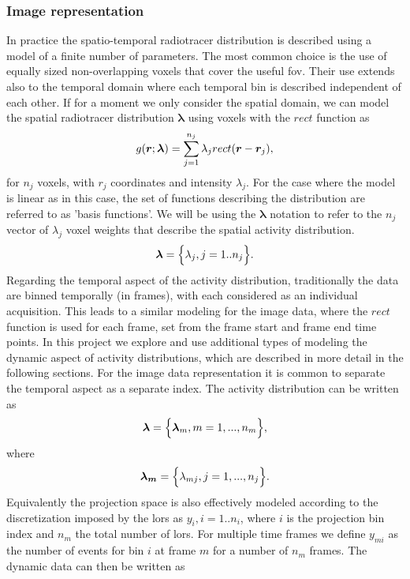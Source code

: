 \subsubsection{Image representation}
In practice the spatio-temporal radiotracer distribution is described using a model of a finite number of parameters. The most common choice is the use of equally sized non-overlapping voxels that cover the useful \gls{fov}. Their use extends also to the temporal domain where each temporal bin is described independent of each other. 
If for a moment we only consider the spatial domain, we can model the spatial radiotracer distribution $\bm{\lambda}$ using voxels with the  $rect$ function as
\begin{equation}
   g(\bm{r};\bm\lambda) = \sum_{j=1}^{n_{j}} \lambda_j {rect}(\bm{r}-\bm{r}_j)  \\, 
\end{equation}
for ${n_{j}}$ voxels, with $r_j$ coordinates and intensity $\lambda_j$.
For the case where the model is linear as in this case, the set of functions describing the distribution are referred to as 'basis functions'. We will be using the $\bm\lambda$ notation to refer to the ${n_{j}}$ vector of  $\lambda_j$ voxel weights that describe the spatial activity distribution. 
\begin{equation}
   \bm\lambda = \Big\{ \lambda_j,j=1..n_j \Big\} \\.
\end{equation}
Regarding the temporal aspect of the activity distribution, traditionally the data are binned temporally (in frames), with each considered as an individual acquisition. This leads to a similar modeling for the image data, where the $rect$ function is used for each frame, set from the frame start and frame end time points. In this project we explore and use additional types of modeling the dynamic aspect of activity distributions, which are described in more detail in the following sections. For the image data representation it is common to separate the temporal aspect as a separate index. The activity distribution can be written as
\begin{equation}
   \bm{\lambda} = \Big\{ {\bm{\lambda}_m,m=1,...,n_m} \Big\} \\,
\end{equation}
where
\begin{equation}
   \bm{\lambda_m} = \Big\{ {\lambda_{mj},j=1,...,n_j} \Big\} \\.
\end{equation}
Equivalently the projection space is also effectively modeled according to the discretization imposed by the \glspl{lor} as $y_i,i=1..n_i$, where $i$ is the projection bin index and $n_m$ the total number of \glspl{lor}. For multiple time frames we define $y_{mi}$ as the number of events for bin $i$ at frame $m$ for a number of $n_m$ frames. The dynamic data can then be written as
